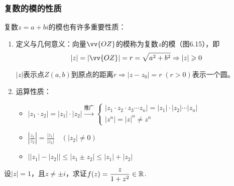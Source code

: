 \subsubsection{复数的模的性质}

复数$z=a+bi$的模也有许多重要性质：
\begin{enumerate}
\item 定义与几何意义：向量$\vv{OZ}$的模称为复数$z$的模（图6.15），即
\[|z|=|\vv{OZ}|=r=\sqrt{a^2+b^2}\Rightarrow |z|\ge 0\]

$|z|$表示点$Z(a,b)$到原点的距离$r\Rightarrow |z-z_0|=r\; (r>0)$表示一个圆。
\item 运算性质：
\begin{itemize}
    \item $|z_1\cdot z_2|=|z_1|\cdot |z_2|\xrightarrow[]{\text{推广}}\begin{cases}
        |z_1\cdot z_2\cdot z_3\cdots z_n|=|z_1|\cdot |z_2|\cdots |z_n|\\
        |z^n|=|z|^n \ne z^n
    \end{cases}$
    \item $\left|\frac{z_1}{z_2}\right|=\frac{|z_1|}{|z_2|}\quad (|z_2|\ne 0)$
    \item $\big||z_1|-|z_2|\big|\le |z_1\pm z_2|\le |z_1|+|z_2|$
\end{itemize}
\end{enumerate}

\begin{example}
    设$|z|=1$，且$z\ne \pm i$，求证$f(z)=\dfrac{z}{1+z^2}\in\mathbb{R}$.
\end{example}

